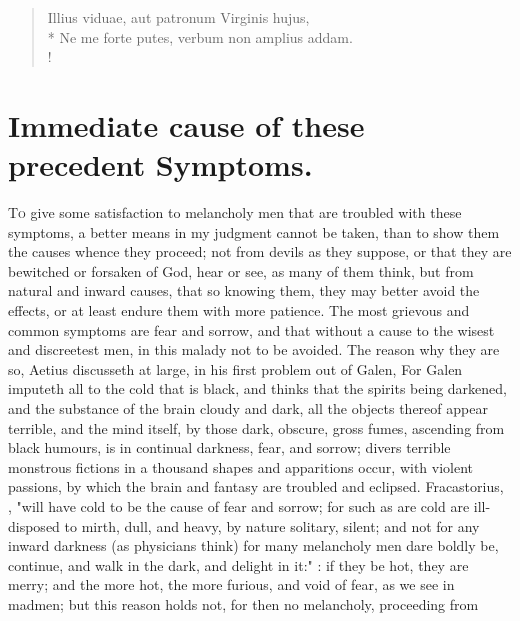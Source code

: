 {\begin{latin}
\begin{verse}%
Illius viduae, aut patronum Virginis hujus,\\*
Ne me forte putes, verbum non amplius addam.\\!
\end{verse}%
\end{latin}




\section{Immediate cause of these precedent Symptoms.}

\lettrine{T}{o} give some satisfaction to melancholy men that are troubled with these
symptoms, a better means in my judgment cannot be taken, than to show them the
causes whence they proceed; not from devils as they suppose, or that they are
bewitched or forsaken of God, hear or see, \etc{} as many of them think, but
from natural and inward causes, that so knowing them, they may better avoid the
effects, or at least endure them with more patience. The most grievous and
common symptoms are fear and sorrow, and that without a cause to the wisest and
discreetest men, in this malady not to be avoided. The reason why they are so,
Aetius discusseth at large,  in his first
problem out of Galen,  For
Galen imputeth all to the cold that is black, and thinks that the spirits being
darkened, and the substance of the brain cloudy and dark, all the objects
thereof appear terrible, and the mind itself, by those
dark, obscure, gross fumes, ascending from black humours, is in continual
darkness, fear, and sorrow; divers terrible monstrous fictions in a thousand
shapes and apparitions occur, with violent passions, by which the brain and
fantasy are troubled and eclipsed. Fracastorius,
, "will have cold to be the cause of
fear and sorrow; for such as are cold are ill-disposed to mirth, dull, and
heavy, by nature solitary, silent; and not for any inward darkness (as
physicians think) for many melancholy men dare boldly be, continue, and walk in
the dark, and delight in it:" : if they be hot, they
are merry; and the more hot, the more furious, and void of fear, as we see in
madmen; but this reason holds not, for then no melancholy, proceeding from
}
